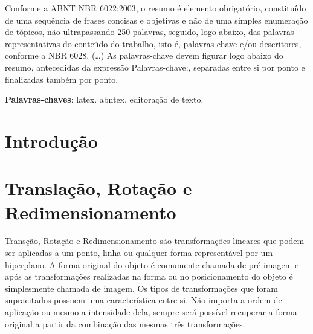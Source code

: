 \documentclass[
	article,			%
	11pt,				%
	oneside,			%
	a4paper,			%
	english,			%
	brazil,				%
	sumario=tradicional
	]{abntex2}
\begin{document}



%
%
\maketitle
\frenchspacing 
\begin{resumoumacoluna}
 Conforme a ABNT NBR 6022:2003, o resumo é elemento obrigatório, constituído de
 uma sequência de frases concisas e objetivas e não de uma simples enumeração
 de tópicos, não ultrapassando 250 palavras, seguido, logo abaixo, das palavras
 representativas do conteúdo do trabalho, isto é, palavras-chave e/ou
 descritores, conforme a NBR 6028. (\ldots) As palavras-chave devem figurar logo
 abaixo do resumo, antecedidas da expressão Palavras-chave:, separadas entre si por
 ponto e finalizadas também por ponto.
 
 \vspace{\onelineskip}
 
 \noindent
 \textbf{Palavras-chaves}: latex. abntex. editoração de texto.
\end{resumoumacoluna}


\textual

\section*{Introdução}


\section{Translação, Rotação e Redimensionamento}
Transção, Rotação e Redimensionamento são transformações lineares que podem ser
aplicadas a um ponto, linha ou qualquer forma representável por um hiperplano.
A forma original do objeto é comumente chamada de pré imagem e após as
transformações realizadas na forma ou no posicionamento do objeto é simplesmente
chamada de imagem.
Os tipos de transformações que foram supracitados possuem uma característica
entre si. Não importa a ordem de aplicação ou mesmo a intensidade dela, sempre
será possível recuperar a forma original a partir da combinação das mesmas três
transformações.
\end{document}
